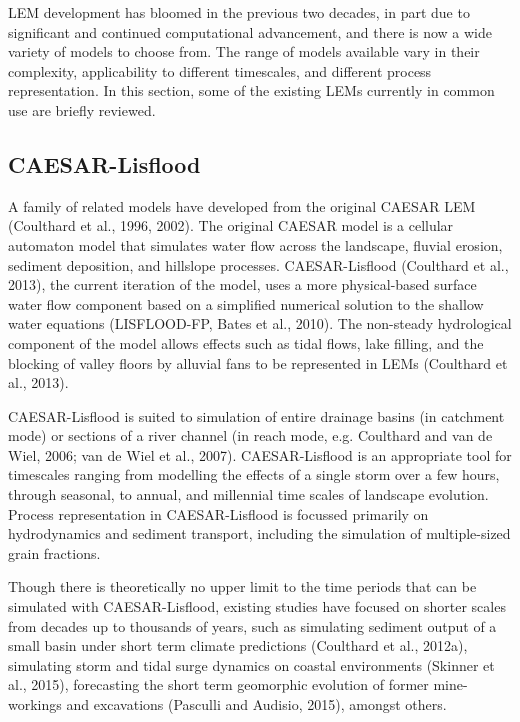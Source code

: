 LEM development has bloomed in the previous two decades, in part due to significant and continued computational advancement, and there is now a wide variety of models to choose from. The range of models available vary in their complexity, applicability to different timescales, and different process representation. In this section, some of the existing LEMs currently in common use are briefly reviewed.

\subsection{CAESAR-Lisflood}

A family of related models have developed from the original CAESAR LEM (Coulthard et al., 1996, 2002). The original CAESAR model is a cellular automaton model that simulates water flow across the landscape, fluvial erosion, sediment deposition, and hillslope processes. CAESAR-Lisflood (Coulthard et al., 2013), the current iteration of the model, uses a more physical-based surface water flow component based on a simplified numerical solution to the shallow water equations (LISFLOOD-FP, Bates et al., 2010). The non-steady hydrological component of the model allows effects such as tidal flows, lake filling, and the blocking of valley floors by alluvial fans to be represented in LEMs (Coulthard et al., 2013). 

CAESAR-Lisflood is suited to simulation of entire drainage basins (in catchment mode) or sections of a river channel (in reach mode, e.g. Coulthard and van de Wiel, 2006; van de Wiel et al., 2007). CAESAR-Lisflood is an appropriate tool for timescales ranging from modelling the effects of a single storm over a few hours, through seasonal, to annual, and millennial time scales of landscape evolution. Process representation in CAESAR-Lisflood is focussed primarily on hydrodynamics and sediment transport, including the simulation of multiple-sized grain fractions. 

Though there is theoretically no upper limit to the time periods that can be simulated with CAESAR-Lisflood, existing studies have focused on shorter scales from decades up to thousands of years, such as simulating sediment output of a small basin under short term climate predictions (Coulthard et al., 2012a), simulating storm and tidal surge dynamics on coastal environments (Skinner et al., 2015), forecasting the short term geomorphic evolution of former mine-workings and excavations (Pasculli and Audisio, 2015), amongst others. 

